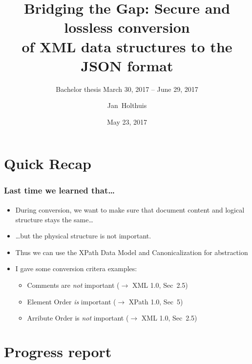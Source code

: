 \documentclass[
    alternativetitlepage=alternativ,
    cornerlogo=hgi_nds_logo2,
    sectionoverview,
]{rubpresentation}
\title[XML/JSON conversions]
{Bridging the Gap: Secure and lossless conversion\\ of XML data structures to the JSON format}
\subtitle{\small Bachelor thesis \hspace{3mm}{\scriptsize $\blacksquare$}\hspace{3mm} March 30, 2017 -- June 29, 2017}
\author[Holthuis]{Jan~Holthuis}
\institute[Advisors]
{%
Advisors: Dennis Felsch \& Paul Rösler
}
\date{May 23, 2017}
\begin{document}
\frame[plain]{\titlepage}




\section{Quick Recap}

\begin{frame}
    \frametitle{Last time we learned that\dots{}}
    \framesubtitle{}
    \begin{itemize}
        \item{} During conversion, we want to make sure that document content and logical structure stays the same\dots{}
        \item{} \dots{}but the physical structure is not important.
        \item{} Thus we can use the XPath Data Model and Canonicalization for abstraction
        \item{} I gave some conversion critera examples:
        \begin{itemize}
            \item{} Comments are \emph{not} important ($\rightarrow$ XML 1.0, Sec~2.5)
            \item{} Element Order \emph{is} important ($\rightarrow$ XPath 1.0, Sec~5)
            \item{} Arribute Order is \emph{not} important ($\rightarrow$ XML 1.0, Sec~2.5)
        \end{itemize}
    \end{itemize}
\end{frame}


\section{Progress report}
\end{document}
